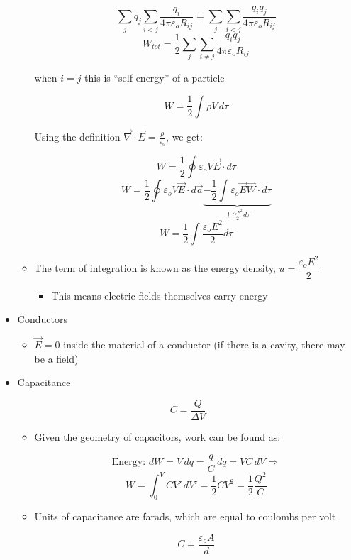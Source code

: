 \begin{itemize}
\begin{itemize}
        $$\sum_jq_j\sum_{i<j}\frac{q_i}{4\pi\varepsilon_oR_{ij}}=\sum_j\sum_{i<j}\frac{q_iq_j}{4\pi\varepsilon_oR_{ij}}$$
        $$W_{tot}=\frac{1}{2}\sum_j\sum_{i\neq j}\frac{q_iq_j}{4\pi\varepsilon_oR_{ij}}$$

        when $i=j$ this is ``self-energy'' of a particle

        $$W=\frac{1}{2}\int\rho V\,d\tau$$

        Using the definition $\vec{\nabla}\cdot\vec{E}=\frac{\rho}{\varepsilon_o}$, we get:

        $$W=\frac{1}{2}\oint \varepsilon_o V\vec{E}\cdot d\tau$$
        $$W=\frac{1}{2}\oint \varepsilon_o V\vec{E}\cdot d\vec{a}\underbrace{-\frac{1}{2}\int\varepsilon_o \vec{E}\vec{W}\cdot d\tau}_{\displaystyle \int \frac{\varepsilon_oE^2}{2}d\tau}$$
        $$W=\frac{1}{2}\int \frac{\varepsilon_oE^2}{2}d\tau$$

      \item The term of integration is known as the energy density, $u=\dfrac{\varepsilon_oE^2}{2}$

        \begin{itemize}

          \item This means electric fields themselves carry energy

        \end{itemize}

    \end{itemize}

  \item Conductors

    \begin{itemize}

      \item $\vec{E}=0$ inside the material of a conductor (if there is a cavity, there may be a field)

    \end{itemize}

  \item Capacitance

    $$C=\frac{Q}{\Delta V}$$

    \begin{itemize}

      \item Given the geometry of capacitors, work can be found as:

        $$\text{Energy: }dW=V\,dq=\frac{q}{C}\,dq=VC\,dV\Rightarrow$$
        $$W=\int_0^VCV'\,dV'=\frac{1}{2}CV^2=\frac{1}{2}\frac{Q^2}{C}$$

      \item Units of capacitance are farads, which are equal to coulombs per volt

        $$C=\frac{\varepsilon_o A}{d}$$

    \end{itemize}

\end{itemize}



